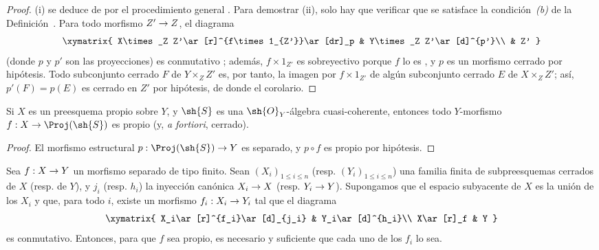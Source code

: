 \documentclass[oneside,10pt]{amsart}
\makeatletter
\renewcommand{\leq}{\leqslant}
\newcommand{\ega@arrow}[2]{\mathchoice{#1}{#2}{#2}{#2}}
\renewcommand{\to}{\ega@arrow{\longrightarrow}{\rightarrow}}
\let\EGAOriginalLabel\label
\renewcommand{\label}[1]{\phantomsection\EGAOriginalLabel{#1}}
\makeatother
\begin{document}
\begin{proof}
(i) se deduce de  por el procedimiento general .
Para demostrar (ii), solo hay que verificar que se satisface la condición~\emph{(b)} de la Definición~.
Para todo morfismo $Z'\to Z$, el diagrama
\[
  \xymatrix{
    X\times_Z Z'\ar[r]^{f\times1_{Z'}}\ar[dr]_p &
    Y\times_Z Z'\ar[d]^{p'}\\
    & Z'
  }
\]
(donde $p$ y $p'$ son las proyecciones) es conmutativo ;
además, $f\times1_{Z'}$ es sobreyectivo porque $f$ lo es , y $p$ es un morfismo cerrado por hipótesis.
Todo subconjunto cerrado $F$ de $Y\times_Z Z'$ es, por tanto, la imagen por $f\times1_{Z'}$ de algún subconjunto cerrado $E$ de $X\times_Z Z'$; así, $p'(F)=p(E)$ es cerrado en $Z'$ por hipótesis, de donde el corolario.
\end{proof}

\begin{corollary}[5.4.4]
\label{II.5.4.4}
Si $X$ es un preesquema propio sobre $Y$, y $\sh{S}$ es una $\sh{O}_Y$-álgebra cuasi-coherente, entonces todo $Y$-morfismo $f:X\to\Proj(\sh{S})$ es propio (y, \emph{a fortiori}, cerrado).
\end{corollary}

\begin{proof}
El morfismo estructural $p:\Proj(\sh{S})\to Y$ es separado, y $p\circ f$ es propio por hipótesis.
\end{proof}

\begin{corollary}[5.4.5]
\label{II.5.4.5}
Sea $f:X\to Y$ un morfismo separado de tipo finito.
Sean $(X_i)_{1\leq i\leq n}$ \textup{(resp. $(Y_i)_{1\leq i\leq n}$)} una familia finita de subpreesquemas cerrados de $X$ \textup{(resp. de $Y$)}, y $j_i$ \textup{(resp. $h_i$)} la inyección canónica $X_i\to X$ \textup{(resp. $Y_i\to Y$)}.
Supongamos que el espacio subyacente de $X$ es la unión de los $X_i$ y que, para todo $i$, existe un morfismo $f_i:X_i\to Y_i$ tal que el diagrama
\[
  \xymatrix{
    X_i\ar[r]^{f_i}\ar[d]_{j_i} &
    Y_i\ar[d]^{h_i}\\
    X\ar[r]_f &
    Y
  }
\]
es conmutativo.
Entonces, para que $f$ sea propio, es necesario y suficiente que cada uno de los $f_i$ lo sea.
\end{corollary}
\end{document}
